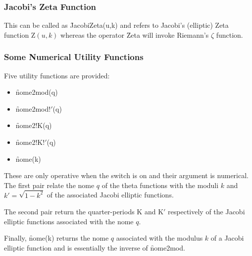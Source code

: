 %
%

\subsubsection{Jacobi's Zeta Function}
\hypertarget{operator:JACOBIZETA}{}

This can be called as \f{JacobiZeta(u,k)} and refers to Jacobi's (elliptic)
Zeta function $\mathrm{Z}(u,k)$ whereas the operator \f{Zeta} will invoke
Riemann's $\zeta$ function.


\subsubsection{Some Numerical Utility Functions}
\hypertarget{operator:nome}{}
\hypertarget{ELLIPNOME}{}
 

Five utility functions are provided:
\begin{itemize}
\item \f{nome2mod(q)}
\item \f{nome2mod!$'$(q)}
\item \f{nome2!K(q)}
\item \f{nome2!K!$'$(q)}
\item \f{nome(k)}
\end{itemize}

These are only operative when the switch  is on and their
argument is numerical. The first pair relate the nome $q$ of the theta
functions with the moduli $k$ and $k'=\sqrt{1-k^2}$ of the associated Jacobi
elliptic functions.

The second pair return the quarter-periods K and K$'$ respectively of
the Jacobi elliptic functions associated with the nome $q$.

Finally, \f{nome(k)} returns the nome $q$ associated with the modulus $k$ of
a Jacobi elliptic function and is essentially the inverse of \f{nome2mod}.

